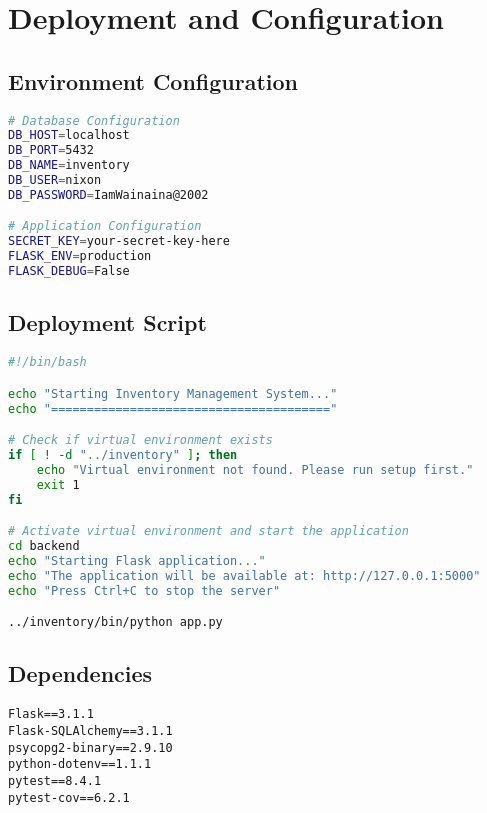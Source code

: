 \documentclass[12pt,a4paper]{article}
\begin{document}
\section{Deployment and Configuration}

\subsection{Environment Configuration}

\begin{lstlisting}[language=bash, caption=Environment Variables (.env)]
# Database Configuration
DB_HOST=localhost
DB_PORT=5432
DB_NAME=inventory
DB_USER=nixon
DB_PASSWORD=IamWainaina@2002

# Application Configuration
SECRET_KEY=your-secret-key-here
FLASK_ENV=production
FLASK_DEBUG=False
\end{lstlisting}

\subsection{Deployment Script}

\begin{lstlisting}[language=bash, caption=Startup Script (start.sh)]
#!/bin/bash

echo "Starting Inventory Management System..."
echo "======================================="

# Check if virtual environment exists
if [ ! -d "../inventory" ]; then
    echo "Virtual environment not found. Please run setup first."
    exit 1
fi

# Activate virtual environment and start the application
cd backend
echo "Starting Flask application..."
echo "The application will be available at: http://127.0.0.1:5000"
echo "Press Ctrl+C to stop the server"

../inventory/bin/python app.py
\end{lstlisting}

\subsection{Dependencies}

\begin{lstlisting}[language=text, caption=Python Requirements (requirements.txt)]
Flask==3.1.1
Flask-SQLAlchemy==3.1.1
psycopg2-binary==2.9.10
python-dotenv==1.1.1
pytest==8.4.1
pytest-cov==6.2.1
\end{lstlisting}
\end{document}
